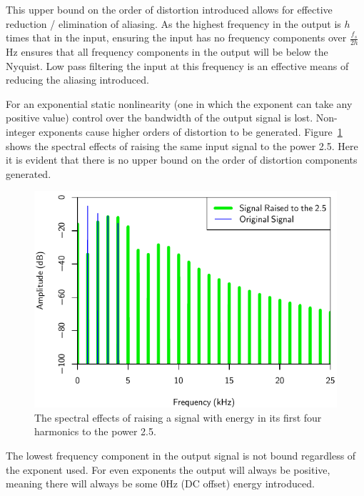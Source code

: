 			This upper bound on the order of distortion introduced allows for effective reduction / elimination
			of aliasing. As the highest frequency in the output is $h$ times that in the input, ensuring the
			input has no frequency components over $\frac{f_{s}}{2h}$Hz ensures that all frequency components
			in the output will be below the Nyquist. Low pass filtering the input at this frequency is an
			effective means of reducing the aliasing introduced.

			For an exponential static nonlinearity (one in which the exponent can take any positive value)
			control over the bandwidth of the output signal is lost. Non-integer exponents cause higher orders
			of distortion to be generated. Figure~\ref{fig:TwoAndAHalfSpectra} shows the spectral effects of
			raising the same input signal to the power 2.5. Here it is evident that there is no upper bound on
			the order of distortion components generated.

			\begin{figure}[h!]
				\centering
				\includegraphics{chapter5/Images/RaisedToTwoAndAHalfSpectra.pdf}
				\caption{The spectral effects of raising a signal with energy in its first four harmonics
					 to the power 2.5.}
				\label{fig:TwoAndAHalfSpectra}
			\end{figure}

			The lowest frequency component in the output signal is not bound regardless of the exponent used.
			For even exponents the output will always be positive, meaning there will always be some 0Hz (DC
			offset) energy introduced.


